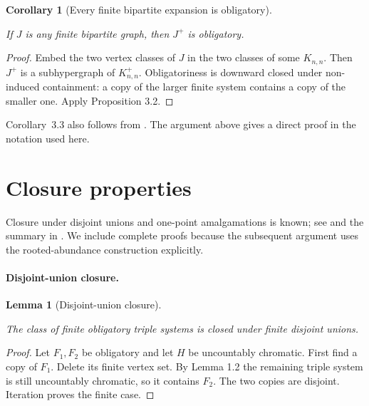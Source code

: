 \documentclass[a4paper,11pt,reqno]{amsart}
\theoremstyle{plain}
\newtheorem{lemma}[theorem]{Lemma}
\newtheorem{corollary}[theorem]{Corollary}
\theoremstyle{definition}
\theoremstyle{remark}
\begin{document}
\begin{corollary}[Every finite bipartite expansion is obligatory]\label{corollary-3.3-every-finite-bipartite-expansion-is-obligatory}

If \(J\) is any finite bipartite graph, then \(J^+\) is obligatory.

\end{corollary}
\begin{proof}
Embed the two vertex classes of \(J\) in the two classes of some \(K_{n,n}\). Then \(J^+\) is a subhypergraph of \(K_{n,n}^+\). Obligatoriness is downward closed under non-induced containment: a copy of the larger finite system contains a copy of the smaller one. Apply Proposition 3.2.
\end{proof}

Corollary~3.3 also follows from \citet[Theorem~1.2]{reiher2024}.  The
argument above gives a direct proof in the notation used here.

\section{Closure properties}\label{closure-of-obligatoriness-under-the-operations-defining-mathcal-b}

Closure under disjoint unions and one-point amalgamations is known; see
\citet[pp.~233--238]{komjath2001} and the summary in
\citet[p.~1]{reiher2024}.  We include complete proofs because the subsequent
argument uses the rooted-abundance construction explicitly.

\paragraph{Disjoint-union closure.}\label{disjoint-union-closure}

\begin{lemma}[Disjoint-union closure]\label{lemma-4.1-disjoint-union-closure}

The class of finite obligatory triple systems is closed under finite disjoint unions.

\end{lemma}
\begin{proof}
Let \(F_1,F_2\) be obligatory and let \(H\) be uncountably chromatic. First find a copy of \(F_1\). Delete its finite vertex set. By Lemma 1.2 the remaining triple system is still uncountably chromatic, so it contains \(F_2\). The two copies are disjoint. Iteration proves the finite case.
\end{proof}
\end{document}
